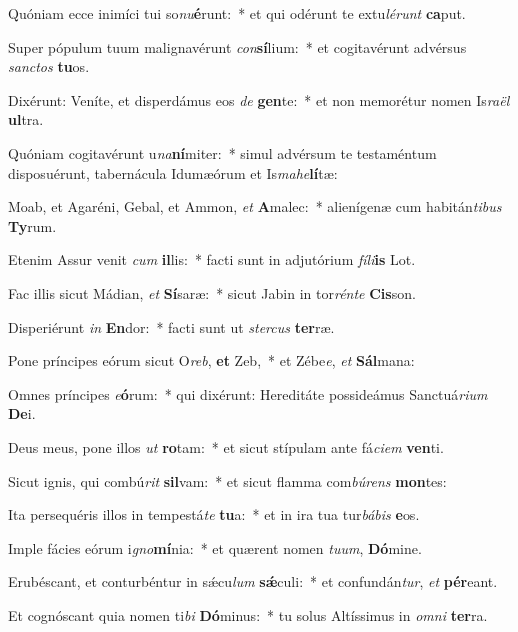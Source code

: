 \item Quóniam ecce inimíci tui so\textit{nu}\textbf{é}runt:~* et qui odérunt te extu\textit{lé}\textit{runt} \textbf{ca}put.
\item Super pópulum tuum malignavérunt \textit{con}\textbf{sí}lium:~* et cogitavérunt advérsus \textit{sanc}\textit{tos} \textbf{tu}os.
\item Dixérunt: Veníte, et disperdámus eos \textit{de} \textbf{gen}te:~* et non memorétur nomen Is\textit{ra}\textit{ël} \textbf{ul}tra.
\item Quóniam cogitavérunt u\textit{na}\textbf{ní}miter:~* simul advérsum te testaméntum disposuérunt, tabernácula Idumæórum et Is\textit{ma}\textit{he}\textbf{lí}tæ:
\item Moab, et Agaréni, Gebal, et Ammon, \textit{et} \textbf{A}malec:~* alienígenæ cum habitán\textit{ti}\textit{bus} \textbf{Ty}rum.
\item Etenim Assur venit \textit{cum} \textbf{il}lis:~* facti sunt in adjutórium \textit{fí}\textit{li}\textbf{is} Lot.
\item Fac illis sicut Mádian, \textit{et} \textbf{Sí}saræ:~* sicut Jabin in tor\textit{rén}\textit{te} \textbf{Cis}son.
\item Disperiérunt \textit{in} \textbf{En}dor:~* facti sunt ut \textit{ster}\textit{cus} \textbf{ter}ræ.
\item Pone príncipes eórum sicut O\textit{reb}, \textbf{et} Zeb,~* et Zébe\textit{e}, \textit{et} \textbf{Sál}mana:
\item Omnes príncipes \textit{e}\textbf{ó}rum:~* qui dixérunt: Hereditáte possideámus Sanctuá\textit{ri}\textit{um} \textbf{De}i.
\item Deus meus, pone illos \textit{ut} \textbf{ro}tam:~* et sicut stípulam ante fá\textit{ci}\textit{em} \textbf{ven}ti.
\item Sicut ignis, qui combú\textit{rit} \textbf{sil}vam:~* et sicut flamma com\textit{bú}\textit{rens} \textbf{mon}tes:
\item Ita persequéris illos in tempestá\textit{te} \textbf{tu}a:~* et in ira tua tur\textit{bá}\textit{bis} \textbf{e}os.
\item Imple fácies eórum i\textit{gno}\textbf{mí}nia:~* et quærent nomen \textit{tu}\textit{um}, \textbf{Dó}mine.
\item Erubéscant, et conturbéntur in sǽcu\textit{lum} \textbf{sǽ}culi:~* et confundán\textit{tur}, \textit{et} \textbf{pér}eant.
\item Et cognóscant quia nomen ti\textit{bi} \textbf{Dó}minus:~* tu solus Altíssimus in \textit{om}\textit{ni} \textbf{ter}ra.
